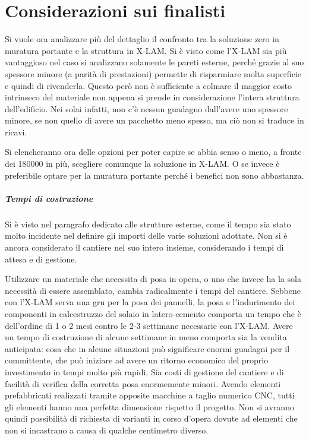 \chapter{Considerazioni sui finalisti}
Si vuole ora analizzare più del dettaglio il confronto tra la soluzione zero in muratura portante e la struttura in X-LAM. 
Si è visto come l'X-LAM sia più vantaggioso nel caso si analizzano solamente le pareti esterne, perché grazie al suo spessore minore (a parità di prestazioni) permette di risparmiare molta superficie e quindi di rivenderla.
Questo però non è sufficiente a colmare il maggior costo intrinseco del materiale non appena si prende in considerazione l'intera struttura dell'edificio. 
Nei solai infatti, non c'è nessun guadagno dall'avere uno spessore minore, se non quello di avere un pacchetto meno spesso, ma ciò non si traduce in ricavi.

Si elencheranno ora delle opzioni per poter capire se abbia senso o meno, a fronte dei \SI{180000}{\teuro} in più, scegliere comunque la soluzione in X-LAM. 
O se invece è preferibile optare per la muratura portante perché i benefici non sono abbastanza.
\paragraph{Tempi di costruzione}
Si è visto nel paragrafo dedicato alle strutture esterne, come il tempo sia stato molto incidente nel definire gli importi delle varie soluzioni adottate.
Non si è ancora considerato il cantiere nel suo intero insieme, considerando i tempi di attesa e di gestione.

Utilizzare un materiale che necessita di posa in opera, o uno che invece ha la sola necessità di essere assemblato, cambia radicalmente i tempi del cantiere.
Sebbene con l'X-LAM serva una gru per la posa dei pannelli, la posa e l'indurimento dei componenti in calcestruzzo del solaio in latero-cemento comporta un tempo che è dell'ordine di 1 o 2 mesi contro le 2-3 settimane necessarie con l'X-LAM. 
Avere un tempo di costruzione di alcune settimane in meno comporta sia la vendita anticipata: cosa che in alcune situazioni può significare enormi guadagni per il committente, che può iniziare ad avere un ritorno economico del proprio investimento in tempi molto più rapidi.
Sia costi di gestione del cantiere e di facilità di verifica della corretta posa enormemente minori. Avendo elementi prefabbricati realizzati tramite apposite macchine a taglio numerico CNC, tutti gli elementi hanno una perfetta dimensione rispetto il progetto. Non si avranno quindi possibilità di richiesta di varianti in corso d'opera dovute ad elementi che non si incastrano a causa di qualche centimetro diverso.

